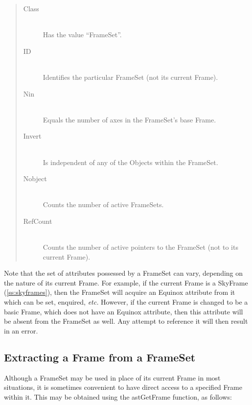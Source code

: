 \documentclass[twoside,11pt]{article}
\newcommand{\htmlref}[2]{#1}
\newcommand{\secref}[1]{\S\ref{#1}}
\renewcommand{\secref}[1]{\ref{#1}}
\begin{document}
\begin{quote}
\begin{description}
\item[\htmlref{Class}{Class}]\mbox{}\\
Has the value ``FrameSet''.

\item[\htmlref{ID}{ID}]\mbox{}\\
Identifies the particular FrameSet (not its current Frame).

\item[\htmlref{Nin}{Nin}]\mbox{}\\
Equals the number of axes in the FrameSet's base Frame.

\item[\htmlref{Invert}{Invert}]\mbox{}\\
Is independent of any of the Objects within the FrameSet.

\item[\htmlref{Nobject}{Nobject}]\mbox{}\\
Counts the number of active FrameSets.

\item[\htmlref{RefCount}{RefCount}]\mbox{}\\
Counts the number of active pointers to the FrameSet (not to its
current Frame).
\end{description}
\end{quote}

Note that the set of attributes possessed by a FrameSet can vary,
depending on the nature of its current Frame. For example, if the
current Frame is a \htmlref{SkyFrame}{SkyFrame} (\secref{ss:skyframes}), then the FrameSet
will acquire an \htmlref{Equinox}{Equinox} attribute from it which can be set, enquired,
{\em{etc.}}  However, if the current Frame is changed to be a basic
Frame, which does not have an Equinox attribute, then this attribute
will be absent from the FrameSet as well. Any attempt to reference it
will then result in an error.

\subsection{Extracting a Frame from a FrameSet}

Although a \htmlref{FrameSet}{FrameSet} may be used in place of its current \htmlref{Frame}{Frame} in most
situations, it is sometimes convenient to have direct access to a
specified Frame within it. This may be obtained using the \htmlref{astGetFrame}{astGetFrame}
function, as follows:
\end{document}
